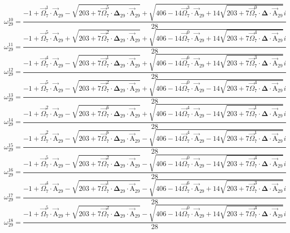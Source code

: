 \documentclass{article}
\begin{document}
\[ \omega_{29}^{10}=\frac{-1+\vec{\Omega}_{7}^{1}\cdot\vec{\mathrm{A}}_{29}-\sqrt{203+7\vec{\Omega}_{7}^{5}\cdot\boldsymbol{\Delta}_{29}\cdot\vec{\mathrm{A}}_{29}}+\sqrt{406-14\vec{\Omega}_{7}^{3}\cdot\vec{\mathrm{A}}_{29}+14\sqrt{203+7\vec{\Omega}_{7}^{0}\cdot\boldsymbol{\Delta}\cdot\vec{\mathrm{A}}_{29}}}i}{28} \]
\[ \omega_{29}^{11}=\frac{-1+\vec{\Omega}_{7}^{5}\cdot\vec{\mathrm{A}}_{29}+\sqrt{203+7\vec{\Omega}_{7}^{2}\cdot\boldsymbol{\Delta}_{29}\cdot\vec{\mathrm{A}}_{29}}+\sqrt{406-14\vec{\Omega}_{7}^{0}\cdot\vec{\mathrm{A}}_{29}+14\sqrt{203+7\vec{\Omega}_{7}^{4}\cdot\boldsymbol{\Delta}\cdot\vec{\mathrm{A}}_{29}}}i}{28} \]
\[ \omega_{29}^{12}=\frac{-1+\vec{\Omega}_{7}^{4}\cdot\vec{\mathrm{A}}_{29}-\sqrt{203+7\vec{\Omega}_{7}^{1}\cdot\boldsymbol{\Delta}_{29}\cdot\vec{\mathrm{A}}_{29}}+\sqrt{406-14\vec{\Omega}_{7}^{6}\cdot\vec{\mathrm{A}}_{29}+14\sqrt{203+7\vec{\Omega}_{7}^{3}\cdot\boldsymbol{\Delta}\cdot\vec{\mathrm{A}}_{29}}}i}{28} \]
\[ \omega_{29}^{13}=\frac{-1+\vec{\Omega}_{7}^{5}\cdot\vec{\mathrm{A}}_{29}-\sqrt{203+7\vec{\Omega}_{7}^{2}\cdot\boldsymbol{\Delta}_{29}\cdot\vec{\mathrm{A}}_{29}}+\sqrt{406-14\vec{\Omega}_{7}^{0}\cdot\vec{\mathrm{A}}_{29}-14\sqrt{203+7\vec{\Omega}_{7}^{4}\cdot\boldsymbol{\Delta}\cdot\vec{\mathrm{A}}_{29}}}i}{28} \]
\[ \omega_{29}^{14}=\frac{-1+\vec{\Omega}_{7}^{2}\cdot\vec{\mathrm{A}}_{29}-\sqrt{203+7\vec{\Omega}_{7}^{6}\cdot\boldsymbol{\Delta}_{29}\cdot\vec{\mathrm{A}}_{29}}+\sqrt{406-14\vec{\Omega}_{7}^{4}\cdot\vec{\mathrm{A}}_{29}-14\sqrt{203+7\vec{\Omega}_{7}^{1}\cdot\boldsymbol{\Delta}\cdot\vec{\mathrm{A}}_{29}}}i}{28} \]
\[ \omega_{29}^{15}=\frac{-1+\vec{\Omega}_{7}^{2}\cdot\vec{\mathrm{A}}_{29}-\sqrt{203+7\vec{\Omega}_{7}^{6}\cdot\boldsymbol{\Delta}_{29}\cdot\vec{\mathrm{A}}_{29}}-\sqrt{406-14\vec{\Omega}_{7}^{4}\cdot\vec{\mathrm{A}}_{29}-14\sqrt{203+7\vec{\Omega}_{7}^{1}\cdot\boldsymbol{\Delta}\cdot\vec{\mathrm{A}}_{29}}}i}{28} \]
\[ \omega_{29}^{16}=\frac{-1+\vec{\Omega}_{7}^{5}\cdot\vec{\mathrm{A}}_{29}-\sqrt{203+7\vec{\Omega}_{7}^{2}\cdot\boldsymbol{\Delta}_{29}\cdot\vec{\mathrm{A}}_{29}}-\sqrt{406-14\vec{\Omega}_{7}^{0}\cdot\vec{\mathrm{A}}_{29}-14\sqrt{203+7\vec{\Omega}_{7}^{4}\cdot\boldsymbol{\Delta}\cdot\vec{\mathrm{A}}_{29}}}i}{28} \]
\[ \omega_{29}^{17}=\frac{-1+\vec{\Omega}_{7}^{4}\cdot\vec{\mathrm{A}}_{29}-\sqrt{203+7\vec{\Omega}_{7}^{1}\cdot\boldsymbol{\Delta}_{29}\cdot\vec{\mathrm{A}}_{29}}-\sqrt{406-14\vec{\Omega}_{7}^{6}\cdot\vec{\mathrm{A}}_{29}+14\sqrt{203+7\vec{\Omega}_{7}^{3}\cdot\boldsymbol{\Delta}\cdot\vec{\mathrm{A}}_{29}}}i}{28} \]
\[ \omega_{29}^{18}=\frac{-1+\vec{\Omega}_{7}^{5}\cdot\vec{\mathrm{A}}_{29}+\sqrt{203+7\vec{\Omega}_{7}^{2}\cdot\boldsymbol{\Delta}_{29}\cdot\vec{\mathrm{A}}_{29}}-\sqrt{406-14\vec{\Omega}_{7}^{0}\cdot\vec{\mathrm{A}}_{29}+14\sqrt{203+7\vec{\Omega}_{7}^{4}\cdot\boldsymbol{\Delta}\cdot\vec{\mathrm{A}}_{29}}}i}{28} \]
\end{document}
